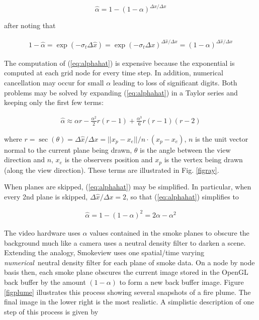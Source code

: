 {\begin{equation}
\label{eq:alphahat}
\hat{\alpha}=1-(1-\alpha)^{\Delta\hat{x}/\Delta x}
\end{equation}

after noting that

\begin{eqnarray}
1-\hat{\alpha}=\exp(-\sigma_t\Delta\hat{x})=\exp(-\sigma_t\Delta
x)^{\Delta\hat{x}/\Delta x}=(1-\alpha)^{\Delta\hat{x}/\Delta x}
\end{eqnarray}

The computation of (\ref{eq:alphahat}) is expensive because the
exponential is computed at each grid node for every time step.  In
addition, numerical cancellation may occur for small $\alpha$
leading to loss of significant digits. Both problems may be solved
by expanding (\ref{eq:alphahat}) in a Taylor series and keeping
only the first few terms:

\begin{eqnarray}
\hat{\alpha}\approx \alpha r -
\frac{\alpha^2}{2}r(r-1)+\frac{\alpha^3}{6}r(r-1)(r-2)
\end{eqnarray}

where $r=\sec(\theta)=\Delta \hat{x}/\Delta
x=||x_p-x_e||/n\cdot(x_p-x_e)$, $n$ is the unit vector normal to
the current plane being drawn, $\theta$ is the angle between the
view direction and $n$, $x_e$ is the observers position and $x_p$
is the vertex being drawn (along the view direction).  These terms
are illustrated in Fig. \ref{figray}.

When planes are skipped, (\ref{eq:alphahat}) may be simplified.
In particular, when every 2nd plane is skipped,
$\Delta\hat{x}/\Delta x=2$, so that (\ref{eq:alphahat}) simplifies
to

\begin{eqnarray}
\hat{\alpha}=1-(1-\alpha)^2=2\alpha-\alpha^2
\end{eqnarray}

The video hardware uses $\alpha$ values contained in the smoke
planes to obscure the background much like a camera uses a neutral
density filter to darken a scene.  Extending the analogy,
Smokeview uses one spatial/time varying {\em numerical}\ neutral
density filter for each plane of smoke data.  On a node by node
basis then, each smoke plane obscures the current image stored in
the OpenGL back buffer by the amount $(1-\alpha)$ to form a new
back buffer image.  Figure \ref{figplume} illustrates this process
showing several snapshots of a fire plume. The final image in the
lower right is the most realistic. A simplistic description of one
step of this process is given by

}
